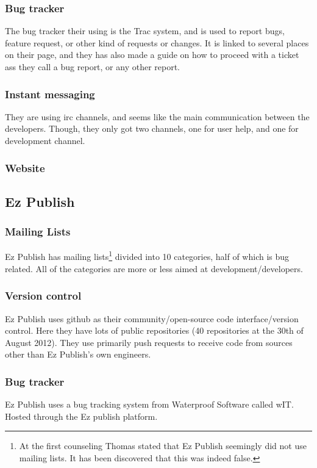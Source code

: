 \documentclass{report} %
\begin{document}
\subsubsection{Bug tracker}
The bug tracker their using is the Trac\cite{tracweb} system, and is used to report bugs, feature request, or other kind of requests or changes. It is linked to several places on their page, and they has also made a guide%
on how to proceed with a ticket ass they call a bug report, or any other report. 
\subsubsection{Instant messaging}
They are using irc channels, and seems like the main communication between the developers. Though, they only got two channels, one for user help, and one for development channel.
\subsubsection{Website}

\subsection{Ez Publish}
\subsubsection{Mailing Lists}
Ez Publish has mailing lists\cite{ezpubwebmaillists}\footnote{At the first counseling Thomas stated that Ez Publish seemingly did not use mailing lists. It has been discovered that this was indeed false.} divided into 10 categories, half of which is bug related. All of the categories are more or less aimed at development/developers.
\subsubsection{Version control}
Ez Publish uses github\cite{ezpubgithub} as their community/open-source code interface/version control. Here they have lots of public repositories (40 repositories at the 30th of August 2012). They use primarily push requests to receive code from sources other than Ez Publish's own engineers. %
\subsubsection{Bug tracker}
Ez Publish uses a bug tracking system from Waterproof Software\cite{waterproofweb} called wIT\cite{waterproofwebwit}. Hosted through the Ez publish platform.
\end{document}
